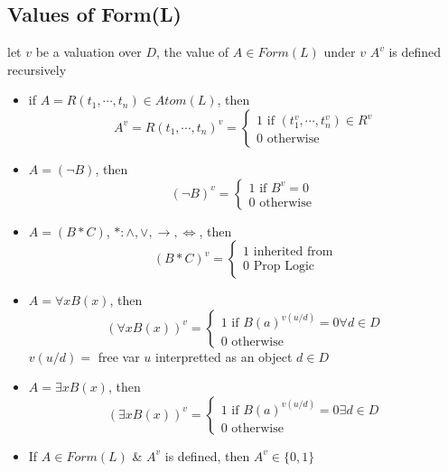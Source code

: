 \documentclass[11pt]{article}
\begin{document}
\subsection{Values of Form(L)}
let $v$ be a valuation over $D$, the value of $A\in Form(L)$ under $v$ $A^v$ is defined recursively
\begin{itemize}
    \item if $A=R(t_1,\cdots,t_n)\in Atom(L)$, then 
    \begin{equation*}
        A^v = R(t_1,\cdots,t_n)^v = 
        \begin{cases}
            1 \text{ if }(t_1^v,\cdots,t_n^v)\in R^v \\
            0 \text{ otherwise}
        \end{cases}
    \end{equation*}
    \item $A=(\neg B)$, then 
    \begin{equation*}
        (\neg B)^v = 
        \begin{cases}
            1 \text{ if }B^v = 0 \\
            0 \text{ otherwise }
        \end{cases}
    \end{equation*}
    \item $A = (B*C)$, $*: \land,\lor,\rightarrow,\iff$, then 
    \begin{equation*}
        (B*C)^v = 
        \begin{cases}
            1 \text{ inherited from} \\
            0 \text{ Prop Logic }
        \end{cases}
    \end{equation*}
    \item $A = \forall x B(x)$, then
    \begin{equation*}
        (\forall x B(x))^v = 
        \begin{cases}
            1 \text{ if }B(a)^{v(u/d)} = 0 \forall d\in D\\
            0 \text{ otherwise }
        \end{cases}
    \end{equation*} 
    $v(u/d) = $ free var $u$ interpretted as an object $d\in D$
    \item $A = \exists x B(x)$, then 
    \begin{equation*}
        (\exists x B(x))^v = 
        \begin{cases}
            1 \text{ if }B(a)^{v(u/d)} = 0 \exists d\in D\\
            0 \text{ otherwise }
        \end{cases}
    \end{equation*} 
    \item If $A\in Form(L)$ \& $A^v$ is defined, then $A^v\in\{0,1\}$
\end{itemize}
\end{document}
